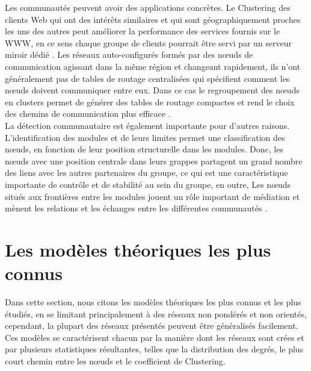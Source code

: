 Les communautés peuvent avoir des applications concrètes. Le Clustering des clients Web qui ont des intérêts similaires et qui sont géographiquement proches les uns des autres peut améliorer la performance des services fournis sur le WWW, en ce sens chaque groupe de clients pourrait être servi par un serveur miroir dédié \cite{KriW2000}.
Les réseaux auto-configurés formés par des nœuds de communication agissant dans la même région et changeant rapidement, ils n'ont généralement pas de tables de routage centralisées qui spécifient comment les nœuds doivent communiquer entre eux.
Dans ce cas le regroupement des nœuds en clusters permet de générer des tables de routage compactes et rend le choix des chemins de communication plus efficace \cite{Steen2001}.\\
La détection communautaire est également importante pour d'autres raisons. L'identification des modules et de leurs limites permet une classification des nœuds, en fonction de leur position structurelle dans les modules. Donc, les nœuds avec une position centrale dans leurs grappes partagent un grand nombre des liens avec les autres partenaires du groupe, ce qui est une caractéristique importante de contrôle et de stabilité au sein du groupe, en outre, Les nœuds situés aux frontières entre les modules jouent un rôle important de médiation et mènent les relations et les échanges entre les différentes communautés \cite{Csermely2008}.

\section{Les modèles théoriques les plus connus} 
Dans cette section, nous citons les modèles théoriques les plus connus et les plus étudiés, en se limitant principalement à des réseaux non pondérés et non orientés, cependant, la plupart des réseaux présentés peuvent être généralisés facilement. Ces modèles se caractérisent chacun par la manière dont les réseaux sont crées et par plusieurs statistiques résultantes, telles que la distribution des degrés, le plus court chemin entre les nœuds et le coefficient de Clustering.

